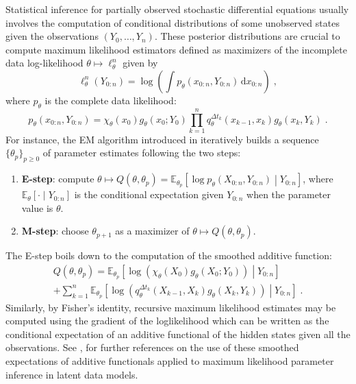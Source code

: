 \documentclass[12pt]{article}
\newcommand{\rmd}{\mathrm{d}}
\newcommand{\eqsp}{\;}
\newcommand{\1}{\mathrm{1}}
\begin{document}
Statistical inference for partially observed stochastic differential equations usually involves the computation of conditional distributions of some unobserved states given the observations $(Y_0,\ldots,Y_n)$. These posterior distributions are crucial to compute maximum likelihood estimators defined as maximizers of the incomplete data log-likelihood $\theta\mapsto \ell_{\theta}^{n}$ given by
\begin{equation*}
\ell_{\theta}^{n}(Y_{0:n}) = \log\left(\int p_{\theta}(x_{0:n},Y_{0:n})\,\rmd x_{0:n}\right)\eqsp,
\end{equation*}  
where $p_{\theta}$ is the complete data likelihood:
\begin{equation*}
p_{\theta}(x_{0:n},Y_{0:n}) = \chi_{\theta}(x_0)g_{\theta}(x_0;Y_0)\prod^{n}_{k=1}q^{\Delta t_k}_{\theta}(x_{k-1},x_k)g_{\theta}(x_k,Y_k)\eqsp.
\end{equation*}
For instance, the EM algorithm introduced in \cite{dempster:laird:rubin:1977} iteratively builds a sequence $\{\theta_{p}\}_{p\ge 0}$ of parameter estimates following the two steps:
\begin{enumerate}
	\item {\bf E-step}: compute $\theta \mapsto Q(\theta,\theta_{p}) = \mathbb{E}_{\theta_p}\left[\log p_{\theta}(X_{0:n},Y_{0:n})\middle|Y_{0:n}\right]$, where $\mathbb{E}_{\theta}\left[\cdot\middle|Y_{0:n}\right]$ is the conditional expectation given $Y_{0:n}$ when the parameter value is $\theta$.
	\item {\bf M-step}: choose $\theta_{p+1}$ as a maximizer of $\theta \mapsto Q(\theta,\theta_{p})$.
\end{enumerate}
The E-step boils down to the computation of the smoothed additive function: 
\begin{multline*}
Q(\theta,\theta_{p}) = \mathbb{E}_{\theta_p}\left[\log \left(\chi_{\theta}(X_0)g_{\theta}(X_0;Y_0)\right)\middle|Y_{0:n}\right] \\
+ \sum_{k=1}^n\mathbb{E}_{\theta_p}\left[\log \left(q^{\Delta t_k}_{\theta}(X_{k-1},X_k)g_{\theta}(X_k,Y_k)\right)\middle|Y_{0:n}\right] \eqsp.
\end{multline*}
Similarly, by Fisher's identity, recursive maximum likelihood estimates may be computed using the gradient of the loglikelihood which can be written as the conditional expectation of an additive functional of the hidden states given all the observations. See \cite[Chapter $10$ and $11$]{cappe:moulines:ryden:2005}, \cite{kantas:doucet:signh:2015,doucet:poyiadjis:singh:2011,lecorff:fort:2013a,lecorff:fort:2013b}
for further references on the use of these smoothed expectations of additive functionals  applied to maximum likelihood parameter inference in latent data models.
\end{document}
